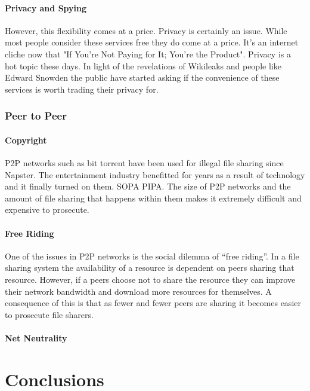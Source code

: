 \documentclass[11pt]{amsart}
\begin{document}
\subsection{Privacy and Spying}
However, this flexibility comes at a price. Privacy is certainly an issue. While most people consider these services free they do come at a price. It's an internet cliche now that "If You're Not Paying for It; You're the Product". Privacy is a hot topic these days. In light of the revelations of Wikileaks and people like Edward Snowden the public have started asking if the convenience of these services is worth trading their privacy for. 
\section{Peer to Peer}

\subsection{Copyright}

P2P networks such as bit torrent have been used for illegal file sharing since Napster. The entertainment industry benefitted for years as a result of technology and it finally turned on them. SOPA PIPA. The size of P2P networks and the amount of file sharing that happens within them makes it extremely difficult and expensive to prosecute.

\subsection{Free Riding}\cite{FreeRiding}

One of the issues in P2P networks is the social dilemma of ``free riding''. In a file sharing system the availability of a resource is dependent on peers sharing that resource. However, if a peers choose not to share the resource they can improve their network bandwidth and download more resources for themselves. A consequence of this is that as fewer and fewer peers are sharing it becomes easier to prosecute file sharers. 

\subsection{Net Neutrality}

\part{Conclusions}




\end{document}

